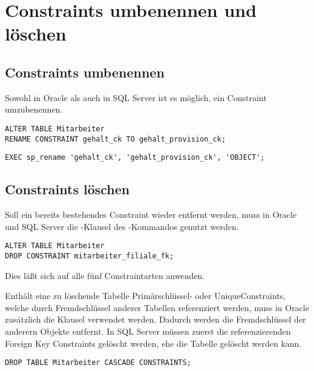     \section{Constraints umbenennen und löschen}
      \subsection{Constraints umbenennen}
        Sowohl in Oracle als auch in SQL Server ist es möglich, ein Constraint umzubenennen.
        \begin{lstlisting}[language=oracle_sql,caption={Ein Constraint umbenennen in Oracle},label=sql09_19]
ALTER TABLE Mitarbeiter
RENAME CONSTRAINT gehalt_ck TO gehalt_provision_ck;
        \end{lstlisting}
        \begin{lstlisting}[language=ms_sql,caption={Ein Constraint umbenennen in SQL Server},label=sql09_20,emphstyle={[9]\color{red}},emph={[9]sp_rename}]
EXEC sp_rename 'gehalt_ck', 'gehalt_provision_ck', 'OBJECT';
        \end{lstlisting}
      \subsection{Constraints löschen}
        Soll ein bereits bestehendes Constraint wieder entfernt werden, muss in Oracle und SQL Server die -Klausel des -Kommandos genutzt werden.
        \begin{lstlisting}[language=oracle_sql,caption={Ein Constraint löschen},label=sql09_21]
ALTER TABLE Mitarbeiter
DROP CONSTRAINT mitarbeiter_filiale_fk;
        \end{lstlisting}
        Dies läßt sich auf alle fünf Constraintarten anwenden.

        Enthält eine zu löschende Tabelle Primär\-schlüssel- oder Unique\-Constraints, welche durch Fremd\-schlüssel anderer Tabellen referenziert werden, muss in Oracle zusätzlich die Klausel  verwendet werden. Dadurch werden die Fremdschlüssel der anderern Objekte entfernt. In SQL Server müssen zuerst die referenzierenden Foreign Key Constraints gelöscht werden, ehe die Tabelle gelöscht werden kann.
        \begin{lstlisting}[language=oracle_sql, caption={Eine Tabelle mit
        Fremdschlüsselbeziehungen löschen},label=sql09_22]
DROP TABLE Mitarbeiter CASCADE CONSTRAINTS;
        \end{lstlisting}
